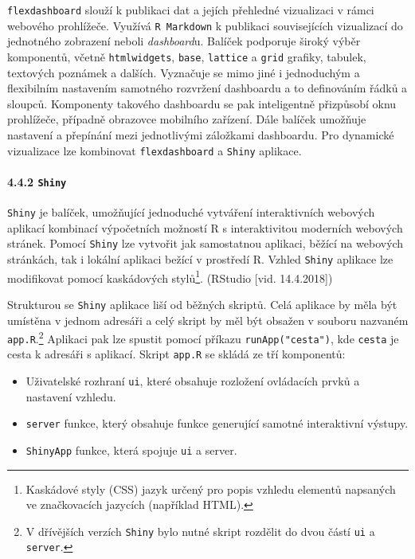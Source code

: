 \documentclass[12pt,]{article}
\providecommand{\tightlist}{%
  \setlength{\itemsep}{0pt}\setlength{\parskip}{0pt}}
\let\oldparagraph\paragraph
\renewcommand{\paragraph}[1]{\oldparagraph{#1}\mbox{}}
\let\rmarkdownfootnote\footnote%
\def\footnote{\protect\rmarkdownfootnote}
\begin{document}
\qquad \texttt{flexdashboard} slouží k publikaci dat a jejích přehledné
vizualizaci v rámci webového prohlížeče. Využívá \texttt{R\ Markdown} k
publikaci souvisejících vizualizací do jednotného zobrazení neboli
\emph{dashboard}u. Balíček podporuje široký výběr komponentů, včetně
\texttt{htmlwidgets}, \texttt{base}, \texttt{lattice} a \texttt{grid}
grafiky, tabulek, textových poznámek a dalších. Vyznačuje se mimo jiné i
jednoduchým a flexibilním nastavením samotného rozvržení dashboardu a to
definováním řádků a sloupců. Komponenty takového dashboardu se pak
inteligentně přizpůsobí oknu prohlížeče, případně obrazovce mobilního
zařízení. Dále balíček umožňuje nastavení a přepínání mezi jednotlivými
záložkami dashboardu. Pro dynamické vizualizace lze kombinovat
\texttt{flexdashboard} a \texttt{Shiny} aplikace. \vspace*{-0.2cm}

\hypertarget{shiny}{\paragraph{\texorpdfstring{4.4.2
\texttt{Shiny}}{4.4.2 Shiny}}\label{shiny}}

\qquad \texttt{Shiny} je balíček, umožňující jednoduché vytváření
interaktivních webových aplikací kombinací výpočetních možností R s
interaktivitou moderních webových stránek. Pomocí \texttt{Shiny} lze
vytvořit jak samostatnou aplikaci, běžící na webových stránkách, tak i
lokální aplikaci bežící v prostředí R. Vzhled \texttt{Shiny} aplikace
lze modifikovat pomocí kaskádových stylů\footnote{Kaskádové styly (CSS)
  jazyk určený pro popis vzhledu elementů napsaných ve značkovacích
  jazycích (například HTML).}. (RStudio {[}vid. 14.4.2018{]})

\qquad Strukturou se \texttt{Shiny} aplikace liší od běžných skriptů.
Celá aplikace by měla být umístěna v jednom adresáři a celý skript by
měl být obsažen v souboru nazvaném \texttt{app.R}.\footnote{V dřívějších
  verzích \texttt{Shiny} bylo nutné skript rozdělit do dvou částí
  \texttt{ui} a \texttt{server}.} Aplikaci pak lze spustit pomocí
příkazu \texttt{runApp("cesta")}, kde \texttt{cesta} je cesta k adresáři
s aplikací. Skript \texttt{app.R} se skládá ze tří komponentů:

\begin{itemize}
\tightlist
\item
  Uživatelské rozhraní \texttt{ui}, které obsahuje rozložení ovládacích
  prvků a nastavení vzhledu.
\item
  \texttt{server} funkce, který obsahuje funkce generující samotné
  interaktivní výstupy.
\item
  \texttt{ShinyApp} funkce, která spojuje \texttt{ui} a server. \newline
\end{itemize}
\end{document}

